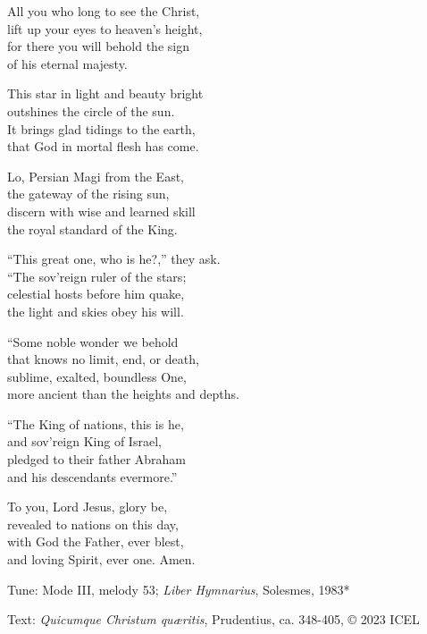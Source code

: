 \hymn

\settowidth{\versewidth}{more ancient than the heights and depths.}

\begin{hymnverse}%
All you who long to see the Christ,\\
lift up your eyes to heaven’s height,\\
for there you will behold the sign\\
of his eternal majesty.

This star in light and beauty bright\\
outshines the circle of the sun.\\
It brings glad tidings to the earth,\\
that God in mortal flesh has come.

Lo, Persian Magi from the East,\\
the gateway of the rising sun,\\
discern with wise and learned skill\\
the royal standard of the King.

“This great one, who is he?,” they ask.\\
“The sov’reign ruler of the stars;\\
celestial hosts before him quake,\\
the light and skies obey his will.

“Some noble wonder we behold\\
that knows no limit, end, or death,\\
sublime, exalted, boundless One,\\
more ancient than the heights and depths.

“The King of nations, this is he,\\
and sov’reign King of Israel,\\
pledged to their father Abraham\\
and his descendants evermore.”

To you, Lord Jesus, glory be,\\
revealed to nations on this day,\\
with God the Father, ever blest,\\
and loving Spirit, ever one. Amen.
\end{hymnverse}

\begin{hymnsource}
Tune: Mode III, melody 53; \emph{Liber Hymnarius}, Solesmes, 1983*

Text: \emph{Quicumque Christum quæritis}, Prudentius, ca. 348-405, © 2023 ICEL
\end{hymnsource}
